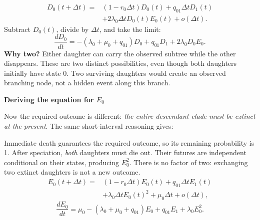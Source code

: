 \documentclass[11pt,a4paper]{article}
\newcommand{\head}[2]{\noindent{\small\sffamily\color{muted}BISSE / #1}\par
 {\LARGE\sffamily\bfseries #2}\par\vspace{3mm}}
\begin{document}
\begin{align*}
D_0(t+\Delta t)={}&(1-r_0\Delta t)D_0(t)+q_{01}\Delta t D_1(t)\\
&+2\lambda_0\Delta t D_0(t)E_0(t)+o(\Delta t).
\end{align*}
Subtract \(D_0(t)\), divide by \(\Delta t\), and take the limit:
\[
\boxed{\frac{dD_0}{dt}=-(\lambda_0+\mu_0+q_{01})D_0
                         +q_{01}D_1+2\lambda_0D_0E_0.}
\]
\textbf{Why two?} Either daughter can carry the observed subtree while the
other disappears. These are two distinct possibilities, even though both
daughters initially have state 0. Two surviving daughters would create an
observed branching node, not a hidden event along this branch.

\newpage
\head{03 / NO LIVING DESCENDANTS}{Deriving the equation for $E_0$}
Now the required outcome is different: \emph{the entire descendant clade must
be extinct at the present}. The same short-interval reasoning gives:

\begin{center}
\end{center}
Immediate death guarantees the required outcome, so its remaining probability
is 1. After speciation, \emph{both} daughters must die out. Their futures are
independent conditional on their states, producing \(E_0^2\).
There is no factor of two: exchanging two extinct daughters is not a new outcome.
\begin{align*}
E_0(t+\Delta t)={}&(1-r_0\Delta t)E_0(t)+q_{01}\Delta t E_1(t)\\
&+\lambda_0\Delta t E_0(t)^2+\mu_0\Delta t+o(\Delta t),
\end{align*}
\[
\boxed{\frac{dE_0}{dt}=\mu_0-(\lambda_0+\mu_0+q_{01})E_0
                         +q_{01}E_1+\lambda_0 E_0^2.}
\]
\end{document}
